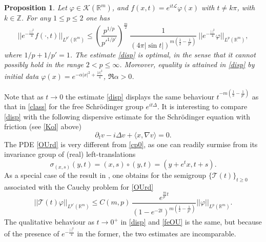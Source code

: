 \documentclass[11pt,a4paper]{amsart}
\def \vf{\varphi}
\newcommand{\Rm}{\mathbb R^m}
\newcommand{\p}{\partial}
\numberwithin{equation}{section}
\newcommand{\sa}{\langle}
\newcommand{\da}{\rangle}
\newtheorem{proposition}[theorem]{Proposition}
\numberwithin{equation}{section}
\begin{document}
\begin{proposition}\label{P:disp}
Let $\vf\in \mathscr K(\Rm)$, and $f(x,t) = e^{it\mathscr L}\vf(x)$ with $t \not= k \pi$, with $k\in \mathbb Z$. For any $1\le p\le 2$ one has
\begin{equation}\label{disp}
||e^{-\frac{|\cdot|^2}4} f(\cdot,t)||_{L^{p'}(\Rm)} \le \left(\frac{p^{1/p}}{{p'}^{1/p'}}\right)^{\frac m2} \ \frac{1}{(4\pi |\sin t|)^{m(\frac 12 - \frac 1{p'})}}\ ||e^{-\frac{|\cdot|^2}4} \vf||_{L^p(\Rm)},
\end{equation}
where $1/p + 1/{p'} = 1$. The estimate \eqref{disp} is optimal, in the sense that it cannot possibly hold in the range $2<p\le \infty$. Moreover, equality is attained in \eqref{disp} by initial data $\vf(x) =  e^{-\alpha |x|^2+ \frac{|x|^2}4}$, $\Re \alpha>0$.  
\end{proposition}
Note that as $t\to 0$ the estimate \eqref{disp} displays the same behaviour $t^{-m(\frac 12 - \frac{1}{p'})}$ as that in \eqref{class} for the free Schr\"odinger group $e^{i t \Delta}$. 
It is interesting to compare \eqref{disp} with the following dispersive estimate for the Schr\"odinger equation with friction (see \eqref{Kol} above)
\begin{equation}\label{OUrd}
\p_t v - i \Delta v + \sa x,\nabla v\da = 0.
\end{equation}
The PDE \eqref{OUrd} is very different from \eqref{cp0}, as one can readily surmise from its invariance group of (real) left-translations 
\[
\sigma_{(x,s)} (y,t) = (x,s)\circ (y,t) = (y + e^{t}x,t+s).
\] 
As a special case of the result in \cite[Theorem 4.1]{GL}, one obtains for the semigroup $\{\mathcal T(t)\}_{t\ge 0}$ associated with the Cauchy problem for \eqref{OUrd}
\begin{equation}\label{feOU}
||\mathcal T(t) \vf||_{L^{p'}(\Rm)} \le C(m,p)\ \frac{e^{\frac{m}{p'} t}}{(1-e^{-2t})^{m(\frac 12 - \frac 1{p'})}} ||\vf||_{L^p(\Rm)}.
\end{equation}
The qualitative behaviour as $t\to 0^+$ in \eqref{disp} and \eqref{feOU} is the same, but because of the presence of $e^{-\frac{|\cdot|^2}4}$ in the former, the two estimates are incomparable.
\end{document}
